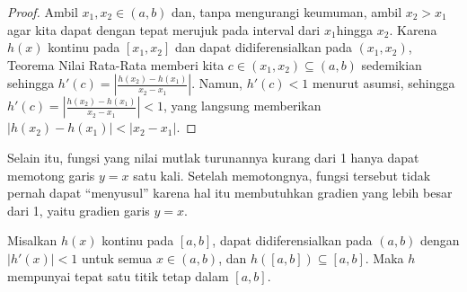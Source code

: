 \begin{proof}
Ambil $x_{1},x_{2}\in(a,b)$ dan, tanpa mengurangi keumuman, ambil
$x_{2}>x_{1}$ agar kita dapat dengan tepat merujuk pada interval
dari $x_{1}$hingga $x_{2}$. Karena $h(x)$ kontinu pada $[x_{1},x_{2}]$
dan dapat didiferensialkan pada $(x_{1},x_{2})$, Teorema Nilai Rata-Rata
memberi kita $c\in(x_{1},x_{2})\subseteq(a,b)$ sedemikian sehingga
$h'(c)=\left|\frac{h(x_{2})-h(x_{1})}{x_{2}-x_{1}}\right|$. Namun,
$h'(c)<1$ menurut asumsi, sehingga $h'(c)=\left|\frac{h(x_{2})-h(x_{1})}{x_{2}-x_{1}}\right|<1$,
yang langsung memberikan $|h(x_{2})-h(x_{1})|<|x_{2}-x_{1}|$.
\end{proof}
Selain itu, fungsi yang nilai mutlak turunannya kurang dari 1 hanya
dapat memotong garis $y=x$ satu kali. Setelah memotongnya, fungsi
tersebut tidak pernah dapat ``menyusul'' karena hal itu membutuhkan
gradien yang lebih besar dari 1, yaitu gradien garis $y=x$. 
\begin{prop}
\label{prop:uniquenessOfFixedPoint}Misalkan $h(x)$ kontinu pada
$[a,b]$, dapat didiferensialkan pada $(a,b)$ dengan $|h'(x)|<1$
untuk semua $x\in(a,b)$, dan $h([a,b])\subseteq[a,b]$. Maka $h$
mempunyai tepat satu titik tetap dalam $[a,b]$.
\end{prop}

